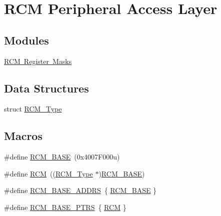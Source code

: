 \hypertarget{group___r_c_m___peripheral___access___layer}{}\section{R\+CM Peripheral Access Layer}
\label{group___r_c_m___peripheral___access___layer}
\subsection*{Modules}
\begin{DoxyCompactItemize}
\item 
\mbox{\hyperlink{group___r_c_m___register___masks}{R\+C\+M Register Masks}}
\end{DoxyCompactItemize}
\subsection*{Data Structures}
\begin{DoxyCompactItemize}
\item 
struct \mbox{\hyperlink{struct_r_c_m___type}{R\+C\+M\+\_\+\+Type}}
\end{DoxyCompactItemize}
\subsection*{Macros}
\begin{DoxyCompactItemize}
\item 
\#define \mbox{\hyperlink{group___r_c_m___peripheral___access___layer_ga0f155ee1b03b8a20749da74c4f19d34d}{R\+C\+M\+\_\+\+B\+A\+SE}}~(0x4007\+F000u)
\item 
\#define \mbox{\hyperlink{group___r_c_m___peripheral___access___layer_gaa5c5e6af3b266654facbd52caa0b8874}{R\+CM}}~((\mbox{\hyperlink{struct_r_c_m___type}{R\+C\+M\+\_\+\+Type}} $\ast$)\mbox{\hyperlink{group___r_c_m___peripheral___access___layer_ga0f155ee1b03b8a20749da74c4f19d34d}{R\+C\+M\+\_\+\+B\+A\+SE}})
\item 
\#define \mbox{\hyperlink{group___r_c_m___peripheral___access___layer_gaf3db57eb66e9dc48fcac7ebf4e6884c6}{R\+C\+M\+\_\+\+B\+A\+S\+E\+\_\+\+A\+D\+D\+RS}}~\{ \mbox{\hyperlink{group___r_c_m___peripheral___access___layer_ga0f155ee1b03b8a20749da74c4f19d34d}{R\+C\+M\+\_\+\+B\+A\+SE}} \}
\item 
\#define \mbox{\hyperlink{group___r_c_m___peripheral___access___layer_gad8549fec4a09b0b485983beadfc3a5fb}{R\+C\+M\+\_\+\+B\+A\+S\+E\+\_\+\+P\+T\+RS}}~\{ \mbox{\hyperlink{group___r_c_m___peripheral___access___layer_gaa5c5e6af3b266654facbd52caa0b8874}{R\+CM}} \}
\end{DoxyCompactItemize}


